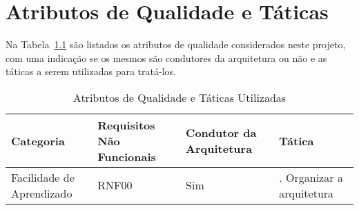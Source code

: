 \chapter{Atributos de Qualidade e Táticas}
\label{sec-atributos}

Na Tabela~\ref{tabela-atributos} são listados os atributos de qualidade considerados neste projeto, com uma indicação se os mesmos são condutores da arquitetura ou não e as táticas a serem utilizadas para tratá-los.

\begin{table}[h]
	\centering	
	\vspace{0.5cm}
	\caption{Atributos de Qualidade e Táticas Utilizadas}	
	\label{tabela-atributos}
	\begin{tabular}{|p{3.5cm}|p{2cm}|p{1.9cm}|p{7cm}|}  \hline 
	
 		\rowcolor[rgb]{0.8,0.8,0.8} Categoria & Requisitos Não Funcionais & Condutor da Arquitetura & Tática \\\hline
 		
 		Facilidade de Aprendizado & RNF00 & Sim & . Organizar a arquitetura \\\hline  
 		
	\end{tabular}
\end{table}
